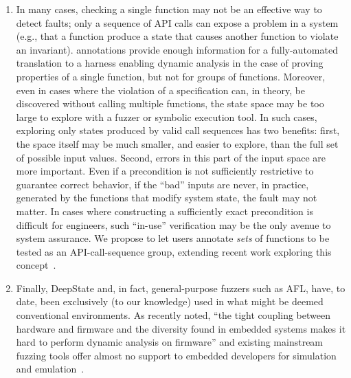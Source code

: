 \begin{enumerate}[labelsep=3pt,leftmargin=12pt]
\item In many cases, checking a single function may not be an effective way to detect faults; only a sequence of API calls can expose a problem in a system (e.g., that a function produce a state that causes another function to violate an invariant).  \acsl annotations provide enough information for a fully-automated translation to a harness enabling dynamic analysis in the case of proving properties of a single function, but not for groups of functions.  Moreover, even in cases where the violation of a specification can, in theory, be discovered without calling multiple functions, the state space may be too large to explore with a fuzzer or symbolic execution tool.  In such cases, exploring only states produced by valid call sequences has two benefits:  first, the space itself may be much smaller, and easier to explore, than the full set of possible input values.  Second, errors in this part of the input space are more important.  Even if a precondition is not sufficiently restrictive to guarantee correct behavior, if the ``bad'' inputs are never, in practice, generated by the functions that modify system state, the fault may not matter.  In cases where constructing a sufficiently exact precondition is difficult for engineers, such ``in-use'' verification may be the only avenue to system assurance.  We propose to let users annotate \emph{sets} of functions to be tested as an API-call-sequence group, extending recent work exploring this concept~\cite{blatter2018static,MetAcsl}.  
  \item Finally, DeepState and, in fact, general-purpose fuzzers such as AFL, have, to date, been exclusively (to our knowledge) used in what might be deemed conventional environments.  As recently noted, ``the tight coupling between hardware and firmware and the diversity found in embedded systems makes it hard to perform dynamic analysis on firmware'' and existing mainstream fuzzing tools offer almost no support to embedded developers for simulation and emulation~\cite{halucinator}.
\end{enumerate}

